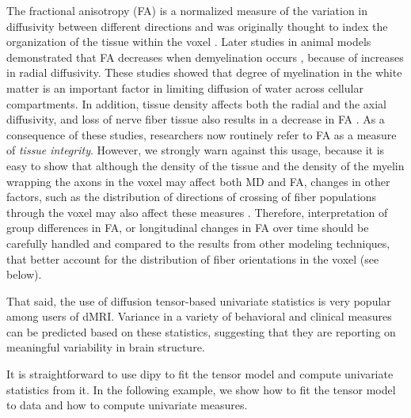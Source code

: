 \documentclass{bioinfo}
\begin{document}
The fractional anisotropy (FA) is a normalized measure of the variation in
diffusivity between different directions and was originally thought to index
the organization of the tissue within the voxel \citep{Basser1996}. Later
studies in animal models demonstrated that FA decreases when demyelination
occurs \citep{Song2002}, because of increases in radial diffusivity. These
studies showed that degree of myelination in the white matter is an important
factor in limiting diffusion of water across cellular compartments. In
addition, tissue density affects both the radial and the axial diffusivity, and
loss of nerve fiber tissue also results in a decrease in FA \citep{Beaulieu1996,
Beaulieu2002}. As a consequence of these studies, researchers now routinely
refer to FA as a measure of \emph{tissue integrity}. However, we
strongly warn against this usage, because it is easy to show that
although the density of the
tissue and the density of the myelin wrapping the axons in the voxel may affect
both MD and FA, changes in other factors, such as the distribution of
directions of crossing of fiber populations through the voxel may also affect
these measures
\citep{Basser1996,wandell-yeatman:13,jones-etal:13}. Therefore,
interpretation
of group differences in FA, or longitudinal changes in FA over time should be
carefully handled and compared to the results from other modeling techniques,
that better account for the distribution of fiber orientations in the voxel
(see below).

That said, the use of diffusion tensor-based univariate statistics is very popular among
users of dMRI. Variance in a variety of
behavioral \citep{Ben-Shachar2007} and clinical \citep{Thomason2011} measures
can be predicted based on these statistics, suggesting that they are reporting
on meaningful variability in brain structure.

It is straightforward to use dipy to fit the tensor model and compute univariate
statistics from it.  In the following example, we show how to fit the tensor
model to data and how to compute univariate measures.
\end{document}
